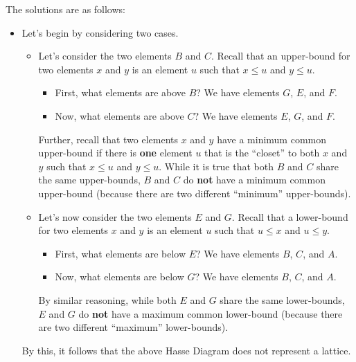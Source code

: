 \documentclass[letterpaper]{article}
\begin{document}
The solutions are as follows:
\begin{itemize}
    \item Let's begin by considering two cases. 
    \begin{itemize}
        \item Let's consider the two elements $B$ and $C$. Recall that an upper-bound for two elements $x$ and $y$ is an element $u$ such that $x \leq u$ and $y \leq u$. 
        \begin{itemize}
            \item First, what elements are above $B$? We have elements $G$, $E$, and $F$.  
            \item Now, what elements are above $C$? We have elements $E$, $G$, and $F$. 
        \end{itemize}
        Further, recall that two elements $x$ and $y$ have a minimum common upper-bound if there is \textbf{one} element $u$ that is the ``closet'' to both $x$ and $y$ such that $x \leq u$ and $y \leq u$. While it is true that both $B$ and $C$ share the same upper-bounds, $B$ and $C$ do \textbf{not} have a minimum common upper-bound (because there are two different ``minimum'' upper-bounds).  

        \item Let's now consider the two elements $E$ and $G$. Recall that a lower-bound for two elements $x$ and $y$ is an element $u$ such that $u \leq x$ and $u \leq y$. 
        \begin{itemize}
            \item First, what elements are below $E$? We have elements $B$, $C$, and $A$. 
            \item Now, what elements are below $G$? We have elements $B$, $C$, and $A$.  
        \end{itemize}
        By similar reasoning, while both $E$ and $G$ share the same lower-bounds, $E$ and $G$ do \textbf{not} have a maximum common lower-bound (because there are two different ``maximum'' lower-bounds). 
    \end{itemize}
    By this, it follows that the above Hasse Diagram does not represent a lattice. 
    
    


\end{itemize}
\end{document}
